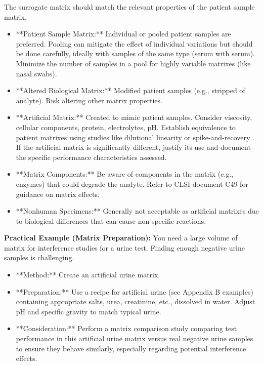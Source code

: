 \documentclass{article}
\begin{document}
The surrogate matrix should match the relevant properties of the patient sample matrix.
\begin{itemize}
    \item **Patient Sample Matrix:** Individual or pooled patient samples are preferred. Pooling can mitigate the effect of individual variations but should be done carefully, ideally with samples of the same type (serum with serum). Minimize the number of samples in a pool for highly variable matrixes (like nasal swabs).
    \item **Altered Biological Matrix:** Modified patient samples (e.g., stripped of analyte). Risk altering other matrix properties.
    \item **Artificial Matrix:** Created to mimic patient samples. Consider viscosity, cellular components, protein, electrolytes, pH. Establish equivalence to patient matrixes using studies like dilutional linearity or spike-and-recovery \cite{CLSIEP14, CLSIEP35}. If the artificial matrix is significantly different, justify its use and document the specific performance characteristics assessed.
    \item **Matrix Components:** Be aware of components in the matrix (e.g., enzymes) that could degrade the analyte. Refer to CLSI document C49 \cite{CLSIC49} for guidance on matrix effects.
    \item **Nonhuman Specimens:** Generally not acceptable as artificial matrixes due to biological differences that can cause non-specific reactions.
\end{itemize}

\textbf{Practical Example (Matrix Preparation):}
You need a large volume of matrix for interference studies for a urine test. Finding enough negative urine samples is challenging.
\begin{itemize}
    \item **Method:** Create an artificial urine matrix.
    \item **Preparation:** Use a recipe for artificial urine (see Appendix B examples) containing appropriate salts, urea, creatinine, etc., dissolved in water. Adjust pH and specific gravity to match typical urine.
    \item **Consideration:** Perform a matrix comparison study comparing test performance in this artificial urine matrix versus real negative urine samples to ensure they behave similarly, especially regarding potential interference effects.
\end{itemize}
\end{document}
